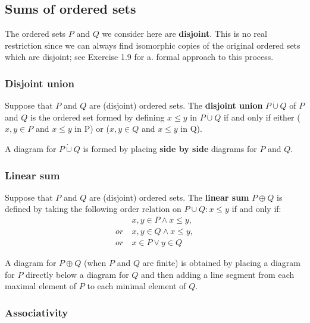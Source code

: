 \documentclass[12pt, letterpaper, oneside]{book}
\begin{document}
\subsection{Sums of ordered sets}

The ordered sets $P$ and $Q$ we consider here are \textbf{disjoint}. This is no real restriction since we can always
find isomorphic copies of the original ordered sets which are disjoint; see Exercise 1.9 for a. formal approach to this
process.

\subsubsection{Disjoint union}

Suppose that $P$ and $Q$ are (disjoint) ordered sets. The \textbf{disjoint union} $P \dot{\cup} Q$ of $P$ and $Q$ is
the ordered set formed by defining $x \leqslant y$ in $P \dot{\cup} Q$ if and only if either ($x,y \in P$ and
$x \leqslant y$ in P) or ($x,y \in Q$ and $x \leqslant y$ in Q).

A diagram for $P \dot{\cup} Q$ is formed by placing \textbf{side by side} diagrams for $P$ and $Q$.

\subsubsection{Linear sum}

Suppose that $P$ and $Q$ are (disjoint) ordered sets. The \textbf{linear sum} $P \oplus Q$ is defined by taking the
following order relation on $P \cup Q: x \leqslant y$ if and only if:
\begin{align*}
        & x, y \in P \land x \leqslant y, \\
  or \  & x, y \in Q \land x \leqslant y, \\
  or \  & x \in P \lor y \in Q
\end{align*}

A diagram for $P \oplus Q$ (when $P$ and $Q$ are finite) is obtained by placing a diagram for $P$ directly below a
diagram for $Q$ and then adding a line segment from each maximal element of $P$ to each minimal element of $Q$.

\subsubsection{Associativity}
\end{document}
